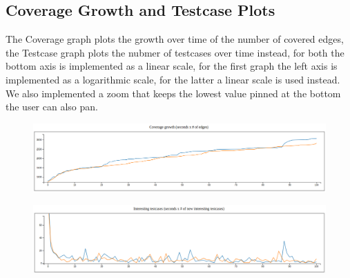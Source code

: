 \documentclass[conference,compsoc]{IEEEtran}
\begin{document}
\subsection{Coverage Growth and Testcase Plots}
The Coverage graph plots the growth over time of the number of covered edges, the Testcase graph plots the nubmer of testcases over time instead, for both the bottom axis is implemented as a linear scale, for the first graph the left axis is implemented as a logarithmic scale, for the latter a linear scale is used instead.
We also implemented a zoom that keeps the lowest value pinned at the bottom the user can also pan.
\begin{figure}[H]
  \includegraphics[scale=0.2]{img/coverage}
  \label{fig:coverage}
\end{figure}
\begin{figure}[H]
  \includegraphics[scale=0.2]{img/inputs}
  \label{fig:inputs}
\end{figure}
\end{document}
